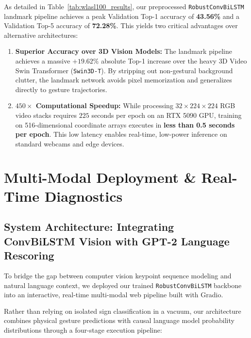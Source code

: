 \documentclass[12pt,a4paper]{article}
\begin{document}
As detailed in Table~\ref{tab:wlasl100_results}, our preprocessed \texttt{RobustConvBiLSTM} landmark pipeline achieves a peak Validation Top-1 accuracy of \textbf{43.56\%} and a Validation Top-5 accuracy of \textbf{72.28\%}. This yields two critical advantages over alternative architectures:
\begin{enumerate}
    \item \textbf{Superior Accuracy over 3D Vision Models:} The landmark pipeline achieves a massive \textbf{$+19.62\%$} absolute Top-1 increase over the heavy 3D Video Swin Transformer (\texttt{Swin3D-T}). By stripping out non-gestural background clutter, the landmark network avoids pixel memorization and generalizes directly to gesture trajectories.
    \item \textbf{$450\times$ Computational Speedup:} While processing $32 \times 224 \times 224$ RGB video stacks requires $225$ seconds per epoch on an RTX 5090 GPU, training on 516-dimensional coordinate arrays executes in \textbf{less than 0.5 seconds per epoch}. This low latency enables real-time, low-power inference on standard webcams and edge devices.
\end{enumerate}




\section{Multi-Modal Deployment \& Real-Time Diagnostics}

\subsection{System Architecture: Integrating ConvBiLSTM Vision with GPT-2 Language Rescoring}
To bridge the gap between computer vision keypoint sequence modeling and natural language context, we deployed our trained \texttt{RobustConvBiLSTM} backbone into an interactive, real-time multi-modal web pipeline built with Gradio. 

Rather than relying on isolated sign classification in a vacuum, our architecture combines physical gesture predictions with causal language model probability distributions through a four-stage execution pipeline:
\end{document}
